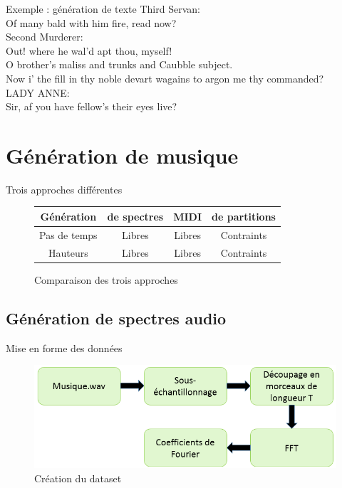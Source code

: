 \documentclass{beamer}
\begin{document}
\begin{frame}{Exemple : génération de texte}
Third Servan:\\
Of many bald with him fire, read now?\\
\medbreak
Second Murderer:\\
Out! where he wal’d apt thou, myself!\\
O brother’s maliss and trunks and Caubble subject.\\
Now i’ the fill in thy noble devart wagains to argon me
thy commanded?\\
\medbreak
LADY ANNE:\\
Sir, af you have fellow’s their eyes live?
\end{frame}

\section{Génération de musique}

\begin{frame}{Trois approches différentes}
\begin{figure}
\begin{center}
\begin{tabular}{|c|c|c|c|}
\hline 
\textbf{Génération} & \textbf{de spectres} & \textbf{MIDI} & \textbf{de partitions} \\
\hline
Pas de temps & Libres & Libres & Contraints \\ 
\hline
Hauteurs & Libres & Libres & Contraints \\
\hline
\end{tabular}
\caption{Comparaison des trois approches}
\end{center}
\end{figure}
\end{frame}

\subsection{Génération de spectres audio}

\begin{frame}{Mise en forme des données}
\begin{figure}
\begin{center}
\includegraphics[scale = 0.57]{images/pipeline.png}
\caption{Création du dataset}
\end{center}
\end{figure}
\end{frame}
\end{document}
